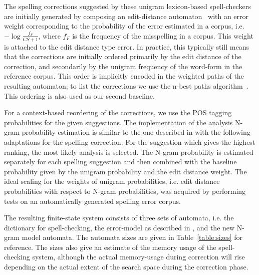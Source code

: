 \documentclass{llncs}
\begin{document}
The spelling corrections suggested by these unigram lexicon-based spell-checkers
are initially generated by composing an edit-distance automaton~\cite{agata/2002} 
with an  error weight corresponding to the probability of the error
estimated in a corpus, i.e. $-\log\frac{f_{F}}{CS+1}$, where $f_F$ is the frequency
of the misspelling in a corpus. This weight is attached to the edit distance type
error. In practice, this typically still means that the corrections are
initially ordered primarily by the edit distance of the correction, and
secondarily by the unigram frequency of the word-form in the reference corpus.
This order is implicitly encoded in the weighted paths of the resulting
automaton; to list the corrections we use the n-best paths
algorithm~\cite{mohri/2002}. This ordering is also used as our second baseline.

For a context-based reordering of the corrections, we use the POS tagging
probabilities for the given suggestions. The implementation of the analysis N-gram
probability estimation is similar to the one described in \cite{silfverberg/2011} with
the following adaptations for the spelling correction. For the suggestion which gives
the highest ranking, the most likely analysis is selected.  The N-gram probability
is estimated separately for each spelling suggestion and then combined with
the baseline probability given by the unigram probability and the edit distance
weight. The ideal scaling for the weights of unigram probabilities, i.e.
edit distance probabilities with respect to N-gram probabilities, was acquired
by performing tests on an automatically generated spelling error corpus.


The resulting finite-state system consists of three sets of automata, i.e. the dictionary
for spell-checking, the error-model as described in
\cite{pirinen/2010/lrec}, and the new N-gram model automata. The automata
sizes are given in Table~\ref{table:sizes} for reference. The sizes also
give an estimate of the memory usage of the spell-checking system, although the
actual memory-usage during correction will rise depending on the actual
extent of the search space during the correction phase.
\end{document}
